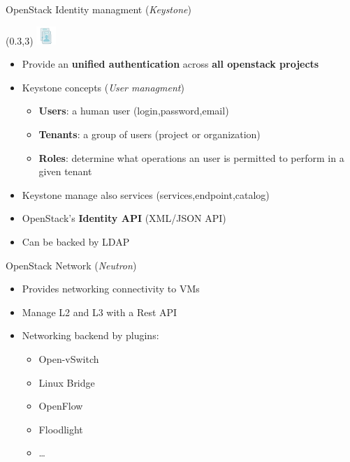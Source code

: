 \begin{frame}{OpenStack Identity managment (\textsl{Keystone})}
  \begin{textblock}{}(0.3,3)
    \includegraphics[width=2em]{img/identity-service}
  \end{textblock}
  \begin{itemize}
    \item Provide an \textbf{unified authentication} across \textbf{all openstack projects}
      \medskip
    \item Keystone concepts (\textsl{User managment})
      \medskip
      \begin{itemize}
        \item \textbf{Users}: a human user (login,password,email)
          \medskip
        \item \textbf{Tenants}: a group of users (project or organization)
          \medskip
        \item \textbf{Roles}: determine what operations an user is permitted to perform in a given tenant
          \medskip
      \end{itemize}
    \item Keystone manage also services (services,endpoint,catalog)
      \medskip
    \item OpenStack’s \textbf{Identity API} (XML/JSON API)
      \medskip
    \item Can be backed by LDAP
  \end{itemize}
\end{frame}

\begin{frame}{OpenStack Network (\textsl{Neutron})}
  \begin{itemize}
    \item Provides networking connectivity to VMs
      \medskip
    \item Manage L2 and L3 with a Rest API
      \medskip
    \item Networking backend by plugins:
      \medskip
      \begin{itemize}
        \item Open-vSwitch
      \medskip
        \item Linux Bridge
      \medskip
        \item OpenFlow
      \medskip
        \item Floodlight
      \medskip
        \item …
      \end{itemize}
  \end{itemize}
\end{frame}

